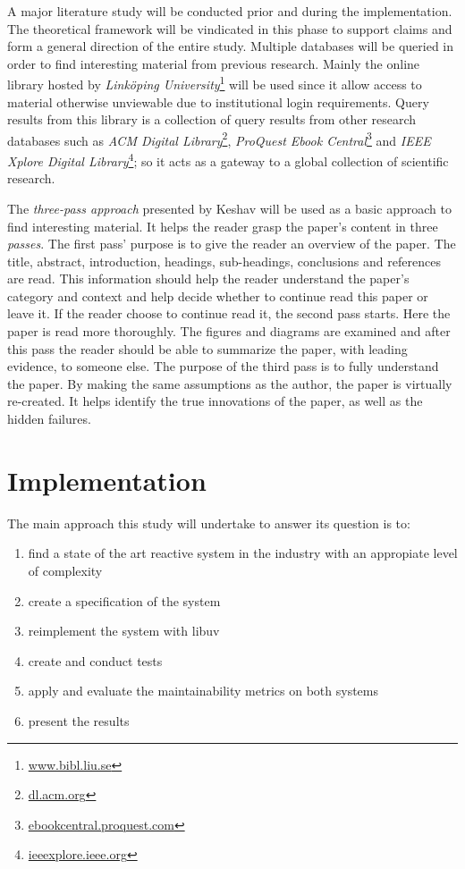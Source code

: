 A major literature study will be conducted prior and during the implementation.
The theoretical framework will be vindicated in this phase to support claims
and form a general direction of the entire study. Multiple databases will be
queried in order to find interesting material from previous research. Mainly
the online library hosted by \textit{Linköping
University}\footnote{\url{www.bibl.liu.se}} will be used since it allow access
to material otherwise unviewable due to institutional login requirements. Query
results from this library is a collection of query results from other research
databases such as \textit{ACM Digital Library}\footnote{\url{dl.acm.org}},
\textit{ProQuest Ebook Central}\footnote{\url{ebookcentral.proquest.com}} and
\textit{IEEE Xplore Digital Library}\footnote{\url{ieeexplore.ieee.org}}; so it
acts as a gateway to a global collection of scientific research.

The \textit{three-pass approach} presented by Keshav \cite{keshav2007read} will
be used as a basic approach to find interesting material. It helps the reader
grasp the paper's content in three \textit{passes}. The first pass' purpose is
to give the reader an overview of the paper. The title, abstract, introduction,
headings, sub-headings, conclusions and references are read. This information
should help the reader understand the paper's category and context and help
decide whether to continue read this paper or leave it. If the reader choose to
continue read it, the second pass starts. Here the paper is read more
thoroughly. The figures and diagrams are examined and after this pass the
reader should be able to summarize the paper, with leading evidence, to someone
else. The purpose of the third pass is to fully understand the paper. By making
the same assumptions as the author, the paper is virtually re-created. It helps
identify the true innovations of the paper, as well as the hidden failures.

\section{Implementation}

The main approach this study will undertake to answer its question is to:

\begin{enumerate}
  \item find a state of the art reactive system in the industry with an
    appropiate level of complexity
  \item create a specification of the system
  \item reimplement the system with libuv
  \item create and conduct tests
  \item apply and evaluate the maintainability metrics on both systems
  \item present the results
\end{enumerate}

